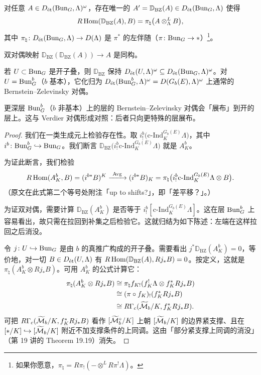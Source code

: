 \begin{theorem}
对任意 $A\in D_{\et}(\Bun_G,\Lambda)^\omega$，存在唯一的 $A'=\mathbb{D}_{\mathrm{BZ}}(A)\in D_{\et}(\Bun_G,\Lambda)$ 使得
\[
R\Hom(\mathbb{D}_{\mathrm{BZ}}(A),B)=\pi_\natural\bigl(A\otimes^L_\Lambda B\bigr),
\]
其中 $\pi_\natural\colon D_{\et}(\Bun_G,\Lambda)\to D(\Lambda)$ 是 $\pi^*$ 的左伴随（$\pi\colon\Bun_G\to\ast$）\footnote{如果你愿意，$\pi_\natural=R\pi_!(-\otimes^L R\pi^!\Lambda)$。}。

双对偶映射 $\mathbb{D}_{\mathrm{BZ}}(\mathbb{D}_{\mathrm{BZ}}(A))\to A$ 是同构。

若 $U\subset\Bun_G$ 是开子叠，则 $\mathbb{D}_{\mathrm{BZ}}$ 保持 $D_{\et}(U,\Lambda)^\omega\subseteq D_{\et}(\Bun_G,\Lambda)^\omega$。对 $U=\Bun^b_G$（$b$ 基本），它化归为 $D_{\et}(\Bun^b_G,\Lambda)^\omega=D(G_b(E),\Lambda)^\omega$ 上通常的 Bernstein–Zelevinsky 对偶。
\end{theorem}

\begin{remark}
更深层 $\Bun^b_G$（$b$ 非基本）上的层的 Bernstein–Zelevinsky 对偶会「展布」到开的层上。这与 Verdier 对偶形成对照：后者只向更特殊的层展布。
\end{remark}

\begin{proof}
我们在一类生成元上检验存在性。取 $i^b_!\bigl(\mathrm{c}\text{-}\mathrm{Ind}^{G_b(E)}_K\Lambda\bigr)$，其中 $i^b\colon\Bun^b_G\hookrightarrow\Bun_G$。我们断言 $\mathbb{D}_{\mathrm{BZ}}\bigl(i^b_!\mathrm{c}\text{-}\mathrm{Ind}^{G_b(E)}_K\Lambda\bigr)$ 就是 $A^b_K$。

为证此断言，我们检验
\[
R\Hom(A^b_K,B)=(i^{b*}B)^K\xrightarrow{\ \mathrm{Avg}\ }(i^{b*}B)_K=\pi_\natural\bigl(i^b_!\mathrm{c}\text{-}\mathrm{Ind}^{G_b(E)}_K\Lambda\otimes B\bigr).
\]
（原文在此式第二个等号处附注「up to shifts?」，即「差平移？」。）

为证双对偶，需要计算 $\mathbb{D}_{\mathrm{BZ}}(A^b_K)$ 是否等于 $i^b_![\mathrm{c}\text{-}\mathrm{Ind}^{G_b(E)}_K\Lambda]$。这在层 $\Bun^b_G$ 上容易看出，故只需在拉回到补集之后检验它。这就归结为如下陈述：左端在这样拉回之后消没。

令 $j\colon U\hookrightarrow\Bun_G$ 是由 $b$ 的真推广构成的开子叠。需要看出 $j^*\mathbb{D}_{\mathrm{BZ}}(A^b_K)=0$，等价地，对一切 $B\in D_{\et}(U,\Lambda)$ 有 $R\Hom(\mathbb{D}_{\mathrm{BZ}}(A),Rj_*B)=0$。按定义，这就是 $\pi_\natural(A^b_K\otimes Rj_*B)$。可用 $A^b_K$ 的公式计算它：
\[
\begin{aligned}
\pi_\natural(A^b_K\otimes Rj_*B)&\cong\pi_\natural f_{K!}(f_K^!\Lambda\otimes f_K^*Rj_*B)\\
&\cong(\pi\circ f_K)_!(f_K^*Rj_*B)\\
&\cong R\Gamma_c(\wt\cM_b/K,f_K^*Rj_*B).
\end{aligned}
\]
可把 $R\Gamma_c(\wt\cM_b/K,f_K^*Rj_*B)$ 看作 $[\wt\cM_b^\circ/K]$ 上朝 $[\wt\cM_b/K]$ 的边界紧支撑、且在 $[\ast/K]\hookrightarrow[\wt\cM_b/K]$ 附近不加支撑条件的上同调。这由「部分紧支撑上同调的消没」（第 19 讲的 Theorem 19.19）消失。
\end{proof}

